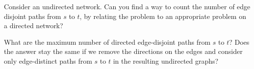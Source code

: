 \documentclass[10pt, a4paper]{article}
\begin{document}
\begin{example}
    Consider an undirected network.
    Can you find a way to count the number of edge disjoint paths from $s$ to $t$,
    by relating the problem to an appropriate problem on a directed network?
\end{example}

\begin{example}
    What are the maximum number of directed edge-disjoint paths from $s$ to $t$?
    Does the answer stay the same if we remove the directions on the edges and consider only edge-distinct paths from $s$ to $t$ in the resulting undirected graphs?
\end{example}
\end{document}
